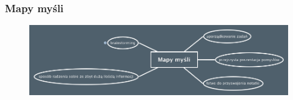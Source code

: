 \begin{frame}
\frametitle{Mapy myśli}

		\begin{figure}
			\includegraphics[width=\textwidth]{mind-map}
		\end{figure}

\end{frame}
